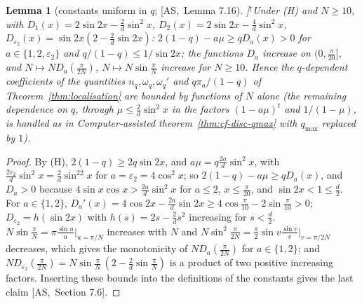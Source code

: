 \documentclass[10pt,a4paper]{article}
\theoremstyle{plain}
\newtheorem{lemma}[theorem]{Lemma}
\theoremstyle{definition}
\newcommand{\NEW}{\ensuremath{^{\dagger}}}       %
\newcommand{\src}[2]{[\textsf{#1},~#2]}           %
\newcommand{\ASY}{\textsf{AS}}
\begin{document}
\begin{lemma}[constants uniform in $q$; \src{\ASY}{Lemma 7.16}]\NEW\label{lem:uniformq}
Under (H) and $N\ge10$, with $D_1(x)=2\sin2x-\frac2d\sin^2x$, $D_2(x)=2\sin2x-\frac4d\sin^2x$, $D_{\varepsilon_2}(x)=\sin2x(2-\frac2d\sin2x)$: $2(1-q)-a\mu\ge qD_a(x)>0$ for $a\in\{1,2,\varepsilon_2\}$ and $q/(1-q)\le1/\sin2x$; the functions $D_a$ increase on $(0,\frac\pi{20}]$, and $N\mapsto ND_a(\frac\pi{2N})$, $N\mapsto N\sin\frac\pi N$ increase for $N\ge10$. Hence the $q$-dependent coefficients of the quantities $n_q,\omega_q,\omega_q'$ and $q\pi_a/(1-q)$ of Theorem~\ref{thm:localisation} are bounded by functions of $N$ alone (the remaining dependence on $q$, through $\mu\le\frac2d\sin^2x$ in the factors $(1-a\mu)^t$ and $1/(1-\mu)$, is handled as in Computer-assisted theorem~\ref{thm:cf-disc-qmax} with $q_{\max}$ replaced by $1$).
\end{lemma}
\begin{proof}
By (H), $2(1-q)\ge2q\sin2x$, and $a\mu=q\frac{2a}d\sin^2x$, with $\frac{2\varepsilon_2}d\sin^2x=\frac2d\sin^22x$ for $a=\varepsilon_2=4\cos^2x$; so $2(1-q)-a\mu\ge qD_a(x)$, and $D_a>0$ because $4\sin x\cos x>\frac{2a}d\sin^2x$ for $a\le2$, $x\le\frac\pi{20}$, and $\sin2x<1\le\frac d2$. For $a\in\{1,2\}$, $D_a'(x)=4\cos2x-\frac{2a}d\sin2x\ge4\cos\frac\pi{10}-2\sin\frac\pi{10}>0$; $D_{\varepsilon_2}=h(\sin2x)$ with $h(s)=2s-\frac2ds^2$ increasing for $s<\frac d2$. $N\sin\frac\pi N=\pi\frac{\sin u}u|_{u=\pi/N}$ increases with $N$ and $N\sin^2\frac\pi{2N}=\frac\pi2\sin v\frac{\sin v}v|_{v=\pi/2N}$ decreases, which gives the monotonicity of $ND_a(\frac\pi{2N})$ for $a\in\{1,2\}$; and $ND_{\varepsilon_2}(\frac\pi{2N})=N\sin\frac\pi N\,(2-\frac2d\sin\frac\pi N)$ is a product of two positive increasing factors. Inserting these bounds into the definitions of the constants gives the last claim \src{\ASY}{Section 7.6}.
\end{proof}
\end{document}

